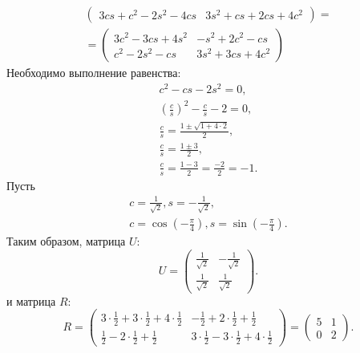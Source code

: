 \begin{example}
\begin{multline*}
\begin{pmatrix}
              3 c s + c^2 - 2 s^2 - 4 c s & 3 s^2 + c s + 2 c s + 4 c^2
        \end{pmatrix}
        = \\
        = \begin{pmatrix}
              3 c^2 - 3 c s + 4 s^2 & - s^2 + 2 c^2 - c s   \\
              c^2 - 2 s^2 - c s     & 3 s^2 + 3 c s + 4 c^2
        \end{pmatrix}
    \end{multline*}
    Необходимо выполнение равенства:
    \begin{gather*}
        c^2 - c s - 2 s^2 = 0 , \\
        \left ( \frac{c}{s} \right )^2 - \frac{c}{s} - 2 = 0 , \\
        \frac{c}{s} = \frac{1 \pm \sqrt{1 + 4 \cdot 2}}{2} , \\
        \frac{c}{s} = \frac{1 \pm 3}{2} , \\
        \frac{c}{s} = \frac{1 - 3}{2} = \frac{-2}{2} = -1 .
    \end{gather*}
    Пусть
    \begin{gather*}
        c = \frac{1}{\sqrt{2}}, s = - \frac{1}{\sqrt{2}} , \\
        c = \cos \left ( - \frac{\pi}{4} \right ), s = \sin \left ( - \frac{\pi}{4} \right ) .
    \end{gather*}
    Таким образом, матрица $U$:
    \[
        U
        = \begin{pmatrix}
              \frac{1}{\sqrt{2}} & - \frac{1}{\sqrt{2}} \\
              \frac{1}{\sqrt{2}} & \frac{1}{\sqrt{2}}
        \end{pmatrix}.
    \]
    и матрица $R$:
    \[
        R
        = \begin{pmatrix}
              3 \cdot \frac{1}{2} + 3 \cdot \frac{1}{2} + 4 \cdot \frac{1}{2} & - \frac{1}{2} + 2 \cdot \frac{1}{2} + \frac{1}{2}               \\
              \frac{1}{2} - 2 \cdot \frac{1}{2} + \frac{1}{2}                 & 3 \cdot \frac{1}{2} - 3 \cdot \frac{1}{2} + 4 \cdot \frac{1}{2}
        \end{pmatrix}
        = \begin{pmatrix}
              5 & 1 \\
              0 & 2
        \end{pmatrix} .
    \]
\end{example}


